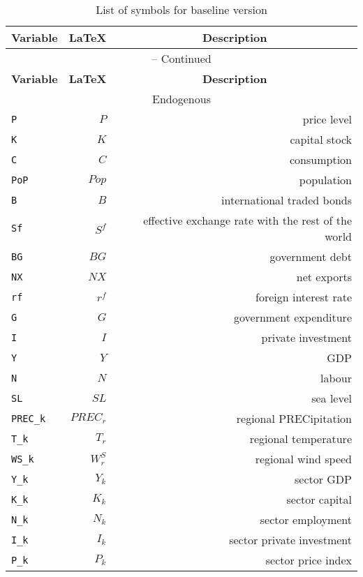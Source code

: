 \begin{center}
\begin{longtable}{lrr}
\caption{List of symbols for baseline version}\label{tab:listofsymbols}\\%
\hline
\multicolumn{1}{c}{\textbf{Variable}} &
\multicolumn{1}{c}{\textbf{\LaTeX}} &
\multicolumn{1}{c}{\textbf{Description}}\\%
\hline\hline%
\endfirsthead
\multicolumn{3}{c}{{\tablename} \thetable{} -- Continued}\\%
\hline%
\multicolumn{1}{c}{\textbf{Variable}} &
\multicolumn{1}{c}{\textbf{\LaTeX}} &
\multicolumn{1}{c}{\textbf{Description}}\\%
\hline\hline%
\endhead
\hline
\multicolumn{3}{c}{Endogenous}\\%
\hline%
\texttt{P} & $P$ & price level\\
\texttt{K} & $K$ & capital stock\\
\texttt{C} & $C$ & consumption\\
\texttt{PoP} & $Pop$ & population\\
\texttt{B} & $B$ & international traded bonds\\
\texttt{Sf} & $S^{f}$ & effective exchange rate with the rest of the world\\
\texttt{BG} & $BG$ & government debt\\
\texttt{NX} & $NX$ & net exports\\
\texttt{rf} & ${r^{f}}$ & foreign interest rate\\
\texttt{G} & $G$ & government expenditure\\
\texttt{I} & $I$ & private investment\\
\texttt{Y} & $Y$ & GDP\\
\texttt{N} & $N$ & labour\\
\texttt{SL} & ${SL}$ & sea level\\
\texttt{PREC\_k} & ${PREC_{r}}$ & regional PRECipitation\\
\texttt{T\_k} & ${T_{r}}$ & regional temperature\\
\texttt{WS\_k} & ${W_{r}^{S}}$ & regional wind speed\\
\texttt{Y\_k} & ${Y_k}$ & sector GDP\\
\texttt{K\_k} & ${K_k}$ & sector capital\\
\texttt{N\_k} & ${N_k}$ & sector employment\\
\texttt{I\_k} & ${I_k}$ & sector private investment\\
\texttt{P\_k} & ${P_k}$ & sector price index\\

\end{longtable}
\end{center}
